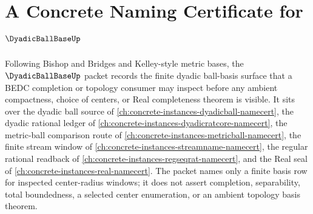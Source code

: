 \chapter{A Concrete Naming Certificate for $\DyadicBallBaseUp$}
\label{ch:concrete-instances-dyadic-ball-base-namecert}

Following Bishop and Bridges and Kelley-style metric bases, the $\DyadicBallBaseUp$ packet records the finite dyadic ball-basis surface that a BEDC completion or topology consumer may inspect before any ambient compactness, choice of centers, or Real completeness theorem is visible. It sits over the dyadic ball source of \autoref{ch:concrete-instances-dyadicball-namecert}, the dyadic rational ledger of \autoref{ch:concrete-instances-dyadicratcore-namecert}, the metric-ball comparison route of \autoref{ch:concrete-instances-metricball-namecert}, the finite stream window of \autoref{ch:concrete-instances-streamname-namecert}, the regular rational readback of \autoref{ch:concrete-instances-regseqrat-namecert}, and the Real seal of \autoref{ch:concrete-instances-real-namecert}. The packet names only a finite basis row for inspected center-radius windows; it does not assert completion, separability, total boundedness, a selected center enumeration, or an ambient topology basis theorem.

